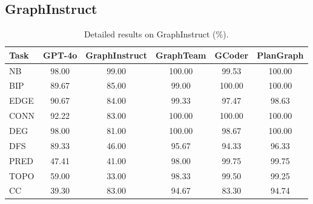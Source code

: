 \documentclass[sigconf,review,anonymous]{acmart}
\begin{document}
\subsection{GraphInstruct}

\begin{table}[H]
\centering
\small
\caption{Detailed results on GraphInstruct (\%).}
\begin{tabular}{lccccc}
\toprule
Task & GPT-4o & GraphInstruct & GraphTeam & GCoder & PlanGraph \\
\midrule
NB & 98.00 & 99.00 & 100.00 & 99.53 & 100.00 \\
BIP & 89.67 & 85.00 & 99.00 & 100.00 & 100.00 \\
EDGE & 90.67 & 84.00 & 99.33 & 97.47 & 98.63 \\
CONN & 92.22 & 83.00 & 100.00 & 100.00 & 100.00 \\
DEG & 98.00 & 81.00 & 100.00 & 98.67 & 100.00 \\
DFS & 89.33 & 46.00 & 95.67 & 94.33 & 96.33 \\
PRED & 47.41 & 41.00 & 98.00 & 99.75 & 99.75 \\
TOPO & 59.00 & 33.00 & 98.33 & 99.50 & 99.25 \\
CC & 39.30 & 83.00 & 94.67 & 83.30 & 94.74 \\
\bottomrule
\end{tabular}
\end{table}
\end{document}
